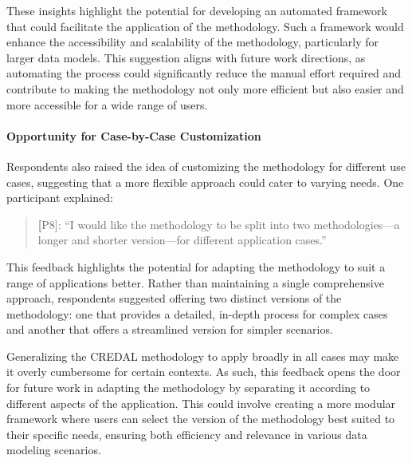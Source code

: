 These insights highlight the potential for developing an automated framework that could facilitate the application of the methodology. Such a framework would enhance the accessibility and scalability of the methodology, particularly for larger data models. This suggestion aligns with future work directions, as automating the process could significantly reduce the manual effort required and contribute to making the methodology not only more efficient but also easier and more accessible for a wide range of users.

\paragraph{Opportunity for Case-by-Case Customization} Respondents also raised the idea of customizing the methodology for different use cases, suggesting that a more flexible approach could cater to varying needs. One participant explained:

\begin{quote} \textbf[P8]: ``I would like the methodology to be split into two methodologies—a longer and shorter version—for different application cases.'' \end{quote}

This feedback highlights the potential for adapting the methodology to suit a range of applications better. Rather than maintaining a single comprehensive approach, respondents suggested offering two distinct versions of the methodology: one that provides a detailed, in-depth process for complex cases and another that offers a streamlined version for simpler scenarios.

Generalizing the CREDAL methodology to apply broadly in all cases may make it overly cumbersome for certain contexts. As such, this feedback opens the door for future work in adapting the methodology by separating it according to different aspects of the application. This could involve creating a more modular framework where users can select the version of the methodology best suited to their specific needs, ensuring both efficiency and relevance in various data modeling scenarios.

